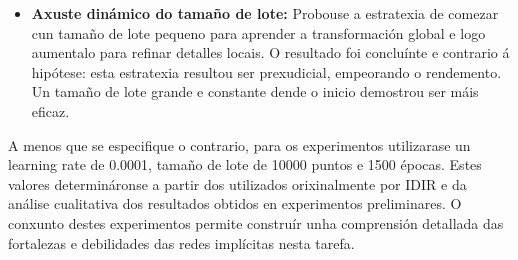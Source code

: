 \begin{itemize}
\item \textbf{Axuste dinámico do tamaño de lote:} Probouse a estratexia de comezar cun tamaño de lote pequeno para aprender a transformación global e logo aumentalo para refinar detalles locais. O resultado foi concluínte e contrario á hipótese: esta estratexia resultou ser prexudicial, empeorando o rendemento. Un tamaño de lote grande e constante dende o inicio demostrou ser máis eficaz.

\end{itemize}

A menos que se especifique o contrario, para os experimentos utilizarase un learning rate de 0.0001, tamaño de lote de 10000 puntos e 1500 épocas. Estes valores determináronse a partir dos utilizados orixinalmente por IDIR e da análise cualitativa dos resultados obtidos en experimentos preliminares. O conxunto destes experimentos permite construír unha comprensión detallada das fortalezas e debilidades das redes implícitas nesta tarefa.
